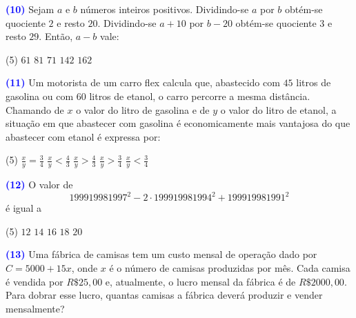 \documentclass[12pt, a4paper]{article}
\newcommand{\negrito}[1]{\mbox{\boldmath{$#1$}}}
\begin{document}
\textcolor{blue}{\bf(10)} Sejam $a$ e $b$ números inteiros positivos. Dividindo-se $a$ por $b$ obtém-se quociente $2$ e resto $20$. Dividindo-se $a+10$ por $b-20$ obtém-se quociente $3$ e resto $29$. Então, $a-b$ vale:
\begin{tasks}[counter-format={(tsk[a])},label-width=3.6ex, label-format = {\bfseries}, column-sep = {0pt}](5)
\task[\textcolor{Floresta}{$\negrito{(a)} $}] $61$
\task[\textcolor{Floresta}{$\negrito{(b)} $}] $81$
\task[\textcolor{Floresta}{$\negrito{(c)} $}] $71$
\task[\textcolor{Floresta}{$\negrito{(d)} $}] $142$
\task[\textcolor{Floresta}{$\negrito{(e)} $}] $162$
\end{tasks}
\textcolor{blue}{\bf(11)} Um motorista de um carro flex calcula que, abastecido com $45$ litros de gasolina ou com $60$ litros de etanol, o carro percorre a mesma distância. Chamando de $x$ o valor do litro de gasolina e de $y$ o valor do litro de etanol, a situação em que abastecer com gasolina é economicamente mais vantajosa do que abastecer com etanol é expressa por:
\begin{tasks}[counter-format={(tsk[a])},label-width=3.6ex, label-format = {\bfseries}, column-sep = {0pt}](5)
\task[\textcolor{Floresta}{$\negrito{(a)} $}] $\frac{x}{y} = \frac{3}{4}$
\task[\textcolor{Floresta}{$\negrito{(b)} $}] $\frac{x}{y} < \frac{4}{3}$ 
\task[\textcolor{Floresta}{$\negrito{(c)} $}] $\frac{x}{y} > \frac{4}{3}$
\task[\textcolor{Floresta}{$\negrito{(d)} $}] $\frac{x}{y} > \frac{3}{4}$
\task[\textcolor{Floresta}{$\negrito{(e)} $}] $\frac{x}{y} < \frac{3}{4}$
\end{tasks}
\textcolor{blue}{\bf(12)} O valor de
\[
199919981997^2 - 2 \cdot 199919981994^2 + 199919981991^2
\]
é igual a
\begin{tasks}[counter-format={(tsk[a])},label-width=3.6ex, label-format = {\bfseries}, column-sep = {0pt}](5)
\task[\textcolor{Floresta}{$\negrito{(a)} $}] $12$
\task[\textcolor{Floresta}{$\negrito{(b)} $}] $14$ 
\task[\textcolor{Floresta}{$\negrito{(c)} $}] $16$
\task[\textcolor{Floresta}{$\negrito{(d)} $}] $18$
\task[\textcolor{Floresta}{$\negrito{(e)} $}] $20$
\end{tasks}
\textcolor{blue}{\bf(13)} Uma fábrica de camisas tem um custo mensal de operação dado por $C = 5000 + 15x$, onde $x$ é o número de camisas produzidas por mês. Cada camisa é vendida por $R\$ 25,00$ e, atualmente, o lucro mensal da fábrica é de $R\$ 2000,00.$  Para dobrar esse lucro, quantas camisas a fábrica deverá produzir e vender mensalmente?
\newline\newline
\end{document}
